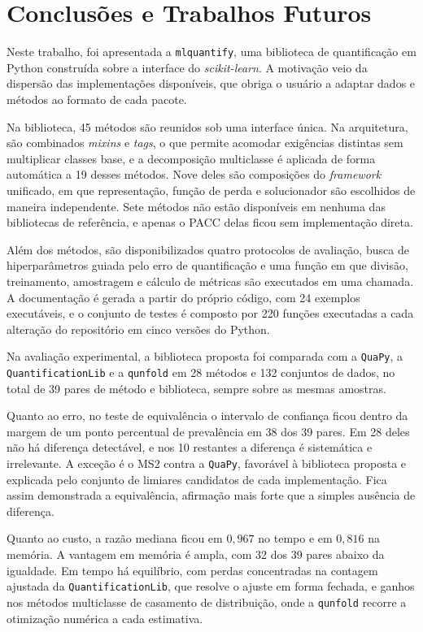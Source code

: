 \chapter{Conclusões e Trabalhos Futuros}
\label{cap:conclusao}

Neste trabalho, foi apresentada a \texttt{mlquantify}, uma biblioteca de quantificação em
Python construída sobre a interface do \textit{scikit-learn}. A motivação veio da
dispersão das implementações disponíveis, que obriga o usuário a adaptar dados e métodos
ao formato de cada pacote.

Na biblioteca, 45 métodos são reunidos sob uma interface única. Na arquitetura, são
combinados \textit{mixins} e \textit{tags}, o que permite acomodar exigências distintas
sem multiplicar classes base, e a decomposição multiclasse é aplicada de forma
automática a 19 desses métodos. Nove deles são composições do \textit{framework}
unificado, em que representação, função de perda e solucionador são escolhidos de
maneira independente. Sete métodos não estão disponíveis em nenhuma das bibliotecas de
referência, e apenas o PACC delas ficou sem implementação direta.

Além dos métodos, são disponibilizados quatro protocolos de avaliação, busca de
hiperparâmetros guiada pelo erro de quantificação e uma função em que divisão,
treinamento, amostragem e cálculo de métricas são executados em uma chamada. A
documentação é gerada a partir do próprio código, com 24 exemplos executáveis, e o
conjunto de testes é composto por 220 funções executadas a cada alteração do
repositório em cinco versões do Python.

Na avaliação experimental, a biblioteca proposta foi comparada com a \verb'QuaPy', a
\verb'QuantificationLib' e a \verb'qunfold' em 28 métodos e 132 conjuntos de dados, no
total de 39 pares de método e biblioteca, sempre sobre as mesmas amostras.

Quanto ao erro, no teste de equivalência o intervalo de confiança ficou dentro da margem
de um ponto percentual de prevalência em 38 dos 39 pares. Em 28 deles não há
diferença detectável, e nos 10 restantes a diferença é sistemática e irrelevante. A
exceção é o MS2 contra a \verb'QuaPy', favorável à biblioteca proposta e explicada pelo
conjunto de limiares candidatos de cada implementação. Fica assim demonstrada a
equivalência, afirmação mais forte que a simples ausência de diferença.

Quanto ao custo, a razão mediana ficou em $0{,}967$ no tempo e em $0{,}816$ na memória. A
vantagem em memória é ampla, com 32 dos 39 pares abaixo da igualdade. Em tempo há
equilíbrio, com perdas concentradas na contagem ajustada da \verb'QuantificationLib',
que resolve o ajuste em forma fechada, e ganhos nos métodos multiclasse de casamento de
distribuição, onde a \verb'qunfold' recorre a otimização numérica a cada estimativa.

